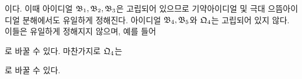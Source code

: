 \noindent{}\par
이다. 이때 아이디얼 $\mathfrak{B}_1,\mathfrak{B}_2,\mathfrak{B}_3$은 고립되어 있으므로 기약아이디얼 및 극대 으뜸아이디얼 분해에서도 유일하게 정해진다. 아이디얼 $\mathfrak{B}_4,\mathfrak{B}_5$와 $\mathfrak{Q}_4$는 고립되어 있지 않다. 이들은 유일하게 정해지지 않으며, 예를 들어
\par\smallskip
\noindent{}\par
로 바꿀 수 있다. 마찬가지로 $\mathfrak{Q}_4$는
\par\smallskip
\noindent{}\par
로 바꿀 수 있다.

